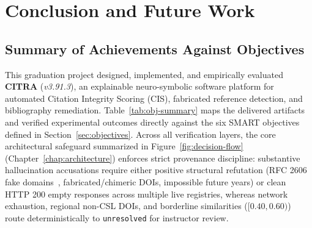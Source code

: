 \chapter{Conclusion and Future Work}
\label{chap:conclusion}

\section{Summary of Achievements Against Objectives}

This graduation project designed, implemented, and empirically evaluated \textbf{CITRA} (\textit{v3.91.3}), an explainable neuro-symbolic software platform for automated Citation Integrity Scoring (CIS), fabricated reference detection, and bibliography remediation. Table~\ref{tab:obj-summary} maps the delivered artifacts and verified experimental outcomes directly against the six SMART objectives defined in Section~\ref{sec:objectives}. Across all verification layers, the core architectural safeguard summarized in Figure~\ref{fig:decision-flow} (Chapter~\ref{chap:architecture}) enforces strict provenance discipline: substantive hallucination accusations require either positive structural refutation (RFC 2606 fake domains~\cite{rfc2606}, fabricated/chimeric DOIs, impossible future years) or clean HTTP 200 empty responses across multiple live registries, whereas network exhaustion, regional non-CSL DOIs, and borderline similarities ($[0.40, 0.60)$) route deterministically to \texttt{unresolved} for instructor review.

